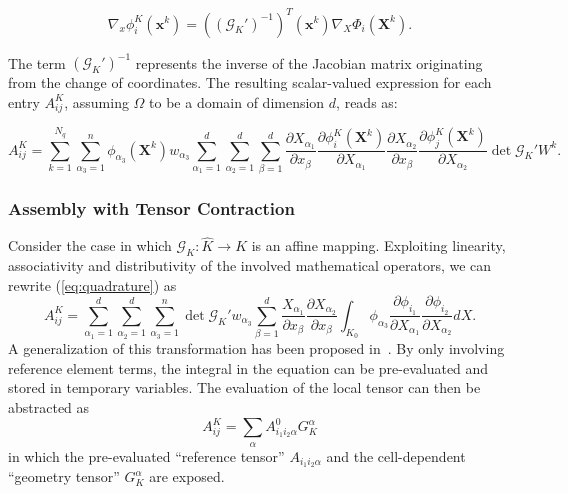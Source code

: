 \begin{equation}
\nabla_x \phi_i^K(\boldsymbol{x}^k) = ((\mathcal{G}_K')^{-1})^{T}(\boldsymbol{x}^k) \nabla_X \Phi_i(\boldsymbol{X}^k).
\end{equation}

The term $(\mathcal{G}_K')^{-1}$ represents the inverse of the Jacobian matrix originating from the change of coordinates. The resulting scalar-valued expression for each entry $A_{ij}^K$, assuming $\Omega$ to be a domain of dimension $d$, reads as:

\begin{equation}
\label{eq:quadrature}
A_{ij}^K = \sum_{k=1}^{N_q} \sum_{\alpha_3=1}^n \phi_{\alpha_3}(\boldsymbol{X}^k) w_{\alpha_3} \sum_{\alpha_1=1}^d \sum_{\alpha_2=1}^d \sum_{\beta=1}^d \frac{\partial X_{\alpha_1}}{\partial x_{\beta}} \frac{\partial \phi_i^K(\boldsymbol{X}^k)}{\partial X_{\alpha_1}} \frac{\partial X_{\alpha_2}}{\partial x_{\beta}} \frac{\partial \phi_j^K(\boldsymbol{X}^k)}{\partial X_{\alpha_2}} \operatorname{det} \mathcal{G}_K' W^k.
\end{equation}


\subsubsection{Assembly with Tensor Contraction}
Consider the case in which $\mathcal{G}_K : \hat{K} \rightarrow K$ is an affine mapping. Exploiting linearity, associativity and distributivity of the involved mathematical operators, we can rewrite (\ref{eq:quadrature}) as
\begin{equation}
\label{eq:tensor}
A_{ij}^K = \sum_{\alpha_1=1}^d \sum_{\alpha_2=1}^d \sum_{\alpha_3=1}^n \operatorname{det} \mathcal{G}_K' w_{\alpha_3} \sum_{\beta=1}^d \frac{X_{\alpha_1}}{\partial x_{\beta}} \frac{\partial X_{\alpha_2}}{\partial x_{\beta}} \int_{K_0} \phi_{\alpha_3} \frac{\partial \phi_{i_1}}{\partial X_{\alpha_1}} \frac{\partial \phi_{i_2}}{\partial X_{\alpha_2}} dX.
\end{equation}
A generalization of this transformation has been proposed in~\cite{FFC-TC}. By only involving reference element terms, the integral in the equation can be pre-evaluated and stored in temporary variables. The evaluation of the local tensor can then be abstracted as
\begin{equation}
A_{ij}^K = \sum_{\alpha} A_{i_1 i_2 \alpha}^0 G_{K}^\alpha
\end{equation}
in which the pre-evaluated ``reference tensor'' $A_{i_1 i_2 \alpha}$ and the cell-dependent ``geometry tensor'' $G_{K}^\alpha$ are exposed. 


